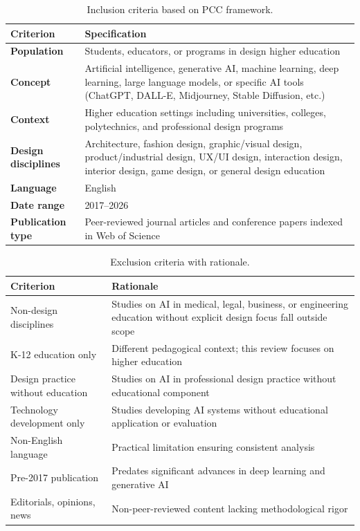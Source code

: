 \documentclass[ed]{acnsart}
\begin{document}
\begin{table}[htbp]
\centering
\caption{Inclusion criteria based on PCC framework.}
\label{tab:inclusion}
\begin{tabularx}{\textwidth}{@{}lX@{}}
\toprule
\hfill \textbf{Criterion} & \hfil \textbf{Specification} \\
\midrule
\textbf{Population} & Students, educators, or programs in design higher education \\
\addlinespace
\textbf{Concept} & Artificial intelligence, generative AI, machine learning, deep learning, large language models, or specific AI tools (ChatGPT, DALL-E, Midjourney, Stable Diffusion, etc.) \\
\addlinespace
\textbf{Context} & Higher education settings including universities, colleges, polytechnics, and professional design programs \\
\addlinespace
\textbf{Design disciplines} & Architecture, fashion design, graphic/visual design, product/industrial design, UX/UI design, interaction design, interior design, game design, or general design education \\
\addlinespace
\textbf{Language} & English \\
\addlinespace
\textbf{Date range} & 2017--2026 \\
\addlinespace
\textbf{Publication type} & Peer-reviewed journal articles and conference papers indexed in Web of Science \\
\bottomrule
\end{tabularx}
\end{table}

\begin{table}[htbp]
\centering
\caption{Exclusion criteria with rationale.}
\label{tab:exclusion}
\small
\begin{tabularx}{\textwidth}{@{}lX@{}}
\toprule
\hfill \textbf{Criterion} & \hfil \textbf{Rationale} \\
\midrule
Non-design disciplines & Studies on AI in medical, legal, business, or engineering education without explicit design focus fall outside scope \\
\addlinespace
K-12 education only & Different pedagogical context; this review focuses on higher education \\
\addlinespace
Design practice without education & Studies on AI in professional design practice without educational component \\
\addlinespace
Technology development only & Studies developing AI systems without educational application or evaluation \\
\addlinespace
Non-English language & Practical limitation ensuring consistent analysis \\
\addlinespace
Pre-2017 publication & Predates significant advances in deep learning and generative AI \\
\addlinespace
Editorials, opinions, news & Non-peer-reviewed content lacking methodological rigor \\
\bottomrule
\end{tabularx}
\end{table}
\end{document}
